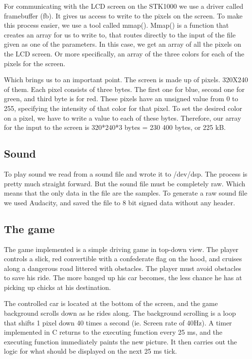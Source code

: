\documentclass[12pt,a4paper,final]{report}
\numberwithin{equation}{section}
\numberwithin{table}{section}
\numberwithin{figure}{section}
\begin{document}
For communicating with the LCD screen on the STK1000 we use a driver called framebuffer (fb). It gives us access to write to the pixels on the screen. To make this process easier, we use a tool called mmap(). Mmap() is a function that creates an array for us to write to, that routes directly to the input of the file given as one of the parameters. In this case, we get an array of all the pixels on the LCD screen. Or more specifically, an array of the three colors for each of the pixels for the screen.

Which brings us to an important point. The screen is made up of pixels. 320X240 of them. Each pixel consists of three bytes. The first one for blue, second one for green, and third byte is for red. These pixels have an unsigned value from 0 to 255, specifying the intensity of that color for that pixel. To set the desired color on a pixel, we have to write a value to each of these bytes. Therefore, our array for the input to the screen is 320*240*3 bytes = 230 400 bytes, or 225 kB.

\subsection{Sound}
\label{sec:sound}

To play sound we read from a sound file and wrote it to /dev/dsp. The process is pretty much straight forward. But the sound file must be completely raw. Which means that the only data in the file are the samples. To generate a raw sound file we used Audacity, and saved the file to 8 bit signed data without any header. 

\subsection{The game}
\label{sec:thegame}

The game implemented is a simple driving game in top-down view. The player controls a slick, red convertible with a confederate flag on the hood, and cruises along a dangerous road littered with obstacles. The player must avoid obstacles to save his ride. The more banged up his car becomes, the less chance he has at picking up chicks at his destination.

The controlled car is located at the bottom of the screen, and the game background scrolls down as he rides along. The background scrolling is a loop that shifts 1 pixel down 40 times a second (ie. Screen rate of 40Hz). A timer implemented in C returns to the executing function every 25 ms, and the executing function immediately paints the new picture. It then carries out the logic for what should be displayed on the next 25 ms tick.
\end{document}
